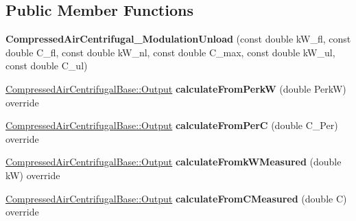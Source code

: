 \subsection*{Public Member Functions}
\begin{DoxyCompactItemize}
\item 
\mbox{\label{class_compressed_air_centrifugal___modulation_unload_a85df431a4be6f96ba472e765472cc906}} 
{\bfseries Compressed\+Air\+Centrifugal\+\_\+\+Modulation\+Unload} (const double k\+W\+\_\+fl, const double C\+\_\+fl, const double k\+W\+\_\+nl, const double C\+\_\+max, const double k\+W\+\_\+ul, const double C\+\_\+ul)
\item 
\mbox{\label{class_compressed_air_centrifugal___modulation_unload_a42db28a07136706618304bdbf4474204}} 
\hyperlink{struct_compressed_air_centrifugal_base_1_1_output}{Compressed\+Air\+Centrifugal\+Base\+::\+Output} {\bfseries calculate\+From\+PerkW} (double PerkW) override
\item 
\mbox{\label{class_compressed_air_centrifugal___modulation_unload_affc986ec8906d8cb5e7a3965004e9b49}} 
\hyperlink{struct_compressed_air_centrifugal_base_1_1_output}{Compressed\+Air\+Centrifugal\+Base\+::\+Output} {\bfseries calculate\+From\+PerC} (double C\+\_\+\+Per) override
\item 
\mbox{\label{class_compressed_air_centrifugal___modulation_unload_a134323d76554bb13beeb7432f78ad74c}} 
\hyperlink{struct_compressed_air_centrifugal_base_1_1_output}{Compressed\+Air\+Centrifugal\+Base\+::\+Output} {\bfseries calculate\+Fromk\+W\+Measured} (double kW) override
\item 
\mbox{\label{class_compressed_air_centrifugal___modulation_unload_afe595e857710d54654db9c0be368fd70}} 
\hyperlink{struct_compressed_air_centrifugal_base_1_1_output}{Compressed\+Air\+Centrifugal\+Base\+::\+Output} {\bfseries calculate\+From\+C\+Measured} (double C) override
\item 
\mbox{\label{class_compressed_air_centrifugal___modulation_unload_a7c0fee63532e5a65b1c69a5752ee8250}} 

\end{DoxyCompactItemize}

